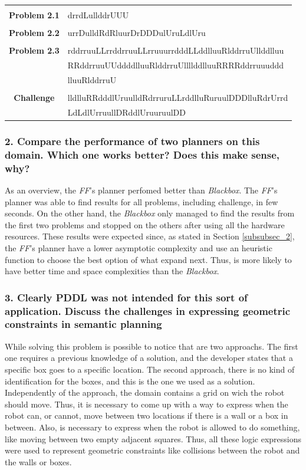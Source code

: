 \documentclass[10pt, letter]{article}
\begin{document}
\begin{tabular}{ c l }
  &\\
  \textbf{Problem 2.1} & drrdLullddrUUU\\
  &\\
  \textbf{Problem 2.2} & urrDulldRdRluurDrDDDulUruLdlUru\\
  &\\
  \textbf{Problem 2.3} & rddrruuLLrrddrruuLLrruuurrdddLLddlluuRlddrruUllddlluu\\
                       & RRddrruuUUddddlluuRlddrruUllllddlluuRRRRddrruuuddd\\
                       & lluuRlddrruU\\
  &\\
  \textbf{Challenge}   & lldlluRRdddlUruulldRdrruruLLrddlluRuruulDDDlluRdrUrrd\\
                       & LdLdlUrruullDRddlUruuruulDD\\
\end{tabular}

\subsubsection*{2. Compare the performance of two planners on this domain. Which one works better? Does this
make sense, why?}

As an overview, the \textit{FF}'s planner perfomed better than \textit{Blackbox}. The \textit{FF}'s planner was able to find results for all problems, including challenge, in few seconds. On the other hand, the \textit{Blackbox} only managed to find the results from the first two problems and stopped on the others after using all the hardware resources. These results were expected since, as stated in Section \ref{subsubsec_2}, the \textit{FF}'s planner have a lower asymptotic complexity and use an heuristic function to choose the best option of what expand next. Thus, is more likely to have better time and space complexities than the \textit{Blackbox}.

\subsubsection*{3. Clearly PDDL was not intended for this sort of application. Discuss the challenges in expressing geometric constraints in semantic planning}

While solving this problem is possible to notice that are two approachs. The first one requires a previous knowledge of a solution, and the developer states that a specific box goes to a specific location. The second approach, there is no kind of identification for the boxes, and this is the one we used as a solution. Independently of the approach, the domain contains a grid on wich the robot should move. Thus, it is necessary to come up with a way to express when the robot can, or cannot, move between two locations if there is a wall or a box in between. Also, is necessary to express when the robot is allowed to do something, like moving between two empty adjacent squares. Thus, all these logic expressions were used to represent geometric constraints like collisions between the robot and the walls or boxes.
\end{document}
